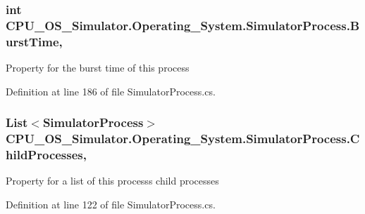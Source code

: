 \subsubsection[{Burst\+Time}]{\setlength{\rightskip}{0pt plus 5cm}int C\+P\+U\+\_\+\+O\+S\+\_\+\+Simulator.\+Operating\+\_\+\+System.\+Simulator\+Process.\+Burst\+Time\hspace{0.3cm}{\ttfamily [get]}, {\ttfamily [set]}}\label{class_c_p_u___o_s___simulator_1_1_operating___system_1_1_simulator_process_a5a340d3421e4251b758752de009b7758}


Property for the burst time of this process 



Definition at line 186 of file Simulator\+Process.\+cs.

\hypertarget{class_c_p_u___o_s___simulator_1_1_operating___system_1_1_simulator_process_a2bcf12b1ea3ce8c369f53eccf1368277}{}
\subsubsection[{Child\+Processes}]{\setlength{\rightskip}{0pt plus 5cm}List$<${\bf Simulator\+Process}$>$ C\+P\+U\+\_\+\+O\+S\+\_\+\+Simulator.\+Operating\+\_\+\+System.\+Simulator\+Process.\+Child\+Processes\hspace{0.3cm}{\ttfamily [get]}, {\ttfamily [set]}}\label{class_c_p_u___o_s___simulator_1_1_operating___system_1_1_simulator_process_a2bcf12b1ea3ce8c369f53eccf1368277}


Property for a list of this process\textquotesingle{}s child processes 



Definition at line 122 of file Simulator\+Process.\+cs.

\hypertarget{class_c_p_u___o_s___simulator_1_1_operating___system_1_1_simulator_process_acbfe6e6b4d06ecfe4ff6952ceed8994c}{}
